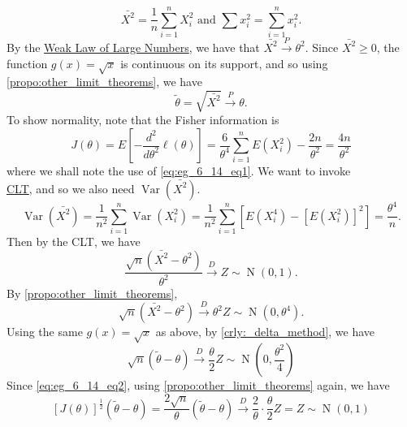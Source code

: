 \documentclass[notoc,notitlepage]{tufte-book}
\DeclareMathOperator{\Nor}{N }
\DeclareMathOperator{\Var}{Var }
\newcommand{\convd}{\overset{D}{\to}}
\newcommand{\convp}{\overset{P}{\to}}
\begin{document}
\begin{solution}
\begin{equation*}
    \bar{X^2} = \frac{1}{n} \sum_{i=1}^{n} X_i^2 \text{ and } \sum x_i^2 = \sum_{i=1}^{n} x_i^2.
  \end{equation*}
  By the \hyperref[eg:weak_law_of_large_numbers]{Weak Law of Large Numbers}, we have that $\bar{X^2} \convp \theta^2$. Since $\bar{X^2} \geq 0$, the function $g(x) = \sqrt{x}$ is continuous on its support, and so using \cref{propo:other_limit_theorems}, we have
  \begin{equation*}
    \tilde{\theta} = \sqrt{ \bar{X^2} } \convp \theta.
  \end{equation*}
  To show normality, note that the Fisher information is
  \begin{equation}\label{eq:eg_6_14_eq2}
    J(\theta) = E\left[ - \frac{d^2}{d \theta^2} \ell(\theta) \right] = \frac{6}{\theta^4} \sum_{i=1}^{n} E(X_i^2) - \frac{2n}{\theta^2} = \frac{4n}{\theta^2}
  \end{equation}
  where we shall note the use of \cref{eq:eg_6_14_eq1}. We want to invoke \\
  \noindent\hyperref[thm:central_limit_theorem]{CLT}, and so we also need $\Var(\bar{X^2})$.
  \begin{equation*}
    \Var(\bar{X^2}) = \frac{1}{n^2} \sum_{i=1}^{n} \Var(X_i^2) = \frac{1}{n^2} \sum_{i=1}^{n} \left[ E\left(X_i^4\right) - \left[ E\left(X_i^2\right) \right]^2 \right] = \frac{\theta^4}{n}.
  \end{equation*}
  Then by the CLT, we have
  \begin{equation*}
    \frac{\sqrt{n} ( \bar{X^2} - \theta^2 )}{\theta^2} \convd Z \sim \Nor(0, 1).
  \end{equation*}
  By \cref{propo:other_limit_theorems},
  \begin{equation*}
    \sqrt{n} ( \bar{X^2} - \theta^2 ) \convd \theta^2 Z \sim \Nor\left(0, \theta^4\right).
  \end{equation*}
  Using the same $g(x) = \sqrt{x}$ as above, by \cref{crly:_delta_method}, we have
  \begin{equation*}
    \sqrt{n}( \tilde{\theta} - \theta ) \convd \frac{\theta}{2} Z \sim \Nor\left(0, \frac{\theta^2}{4}\right)
  \end{equation*}
  Since \cref{eq:eg_6_14_eq2}, using \cref{propo:other_limit_theorems} again, we have
  \begin{equation*}
    \left[ J(\theta) \right]^{\frac{1}{2}} ( \tilde{\theta} - \theta ) = \frac{2\sqrt{n}}{\theta} ( \tilde{\theta} - \theta ) \convd \frac{2}{\theta} \cdot \frac{\theta}{2} Z = Z \sim \Nor(0, 1)
  \end{equation*}

\end{solution}
\end{document}
